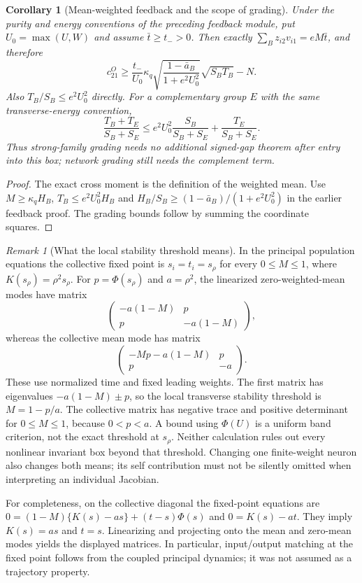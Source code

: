 \documentclass{article} %
\theoremstyle{plain}
\newtheorem{corollary}[theorem]{Corollary}
\theoremstyle{definition}
\theoremstyle{remark}
\newtheorem{remark}[theorem]{Remark}
\begin{document}
\begin{corollary}[Mean-weighted feedback and the scope of grading]
\label{sbemp:feedback}
Under the purity and energy conventions of the preceding feedback
module, put $U_0=\max(U,W)$ and assume $\bar t\ge t_->0$.
Then exactly $\sum_Bz_{i2}v_{i1}=eM\bar t$, and therefore
\[
 c_{21}^O\ge
 \frac{t_-}{U_0}\kappa_q
 \sqrt{\frac{1-\bar a_B}{1+e^2U_0^2}}\sqrt{S_BT_B}-N.
\]
Also $T_B/S_B\le e^2U_0^2$ directly.
For a complementary group $E$ with the same transverse-energy convention,
\[
 \frac{T_B+T_E}{S_B+S_E}
 \le e^2U_0^2\frac{S_B}{S_B+S_E}
       +\frac{T_E}{S_B+S_E}.
\]
Thus strong-family grading needs no additional signed-gap theorem after
entry into this box; network grading still needs the complement term.
\end{corollary}
\begin{proof}
The exact cross moment is the definition of the weighted mean.
Use $M\ge\kappa_qH_B$, $T_B\le e^2U_0^2H_B$ and
$H_B/S_B\ge(1-\bar a_B)/(1+e^2U_0^2)$ in the earlier feedback proof.
The grading bounds follow by summing the coordinate squares.
\end{proof}

\begin{remark}[What the local stability threshold means]
In the principal population equations the collective fixed point is
$s_i=t_i=s_\rho$ for every $0\le M\le1$, where
$K(s_\rho)=\rho^2s_\rho$.
For $p=\Phi(s_\rho)$ and $a=\rho^2$, the linearized zero-weighted-mean
modes have matrix
\[
 \begin{pmatrix}-a(1-M)&p\\p&-a(1-M)\end{pmatrix},
\]
whereas the collective mean mode has matrix
\[
 \begin{pmatrix}-Mp-a(1-M)&p\\p&-a\end{pmatrix}.
\]
These use normalized time and fixed leading weights. The first matrix
has eigenvalues $-a(1-M)\pm p$, so the local transverse stability
threshold is $M=1-p/a$. The collective matrix has negative trace and
positive determinant for $0\le M\le1$, because $0<p<a$.
A bound using $\Phi(U)$ is a uniform band criterion, not the exact
threshold at $s_\rho$. Neither calculation rules out every nonlinear
invariant box beyond that threshold. Changing one finite-weight neuron
also changes both means; its self contribution must not be silently
omitted when interpreting an individual Jacobian.

For completeness, on the collective diagonal the fixed-point equations
are $0=(1-M)\{K(s)-as\}+(t-s)\Phi(s)$ and $0=K(s)-at$.
They imply $K(s)=as$ and $t=s$. Linearizing and projecting onto the mean
and zero-mean modes yields the displayed matrices. In particular,
input/output matching at the fixed point follows from the coupled
principal dynamics; it was not assumed as a trajectory property.
\end{remark}
\end{document}
